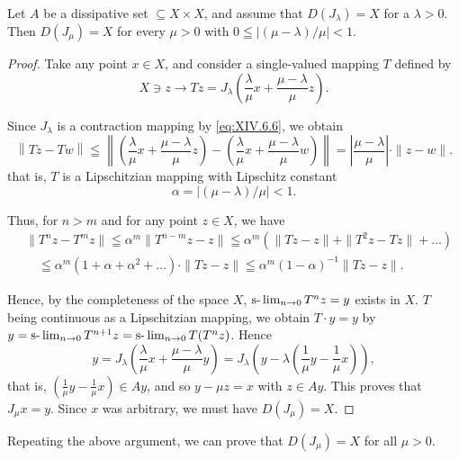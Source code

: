 \begin{lemma}\label{lem:XIV.6.Lemma.2} Let $A$ be a dissipative set $\subseteq X \times X$, and assume that $D(J_{\lambda}) = X$ for a $\lambda > 0$. Then $D(J_{\mu}) = X$ for every $\mu > 0$ with $0 \leqq |(\mu - \lambda)/\mu| < 1$. 
\end{lemma}

\begin{proof}
 Take any point $x \in X$, and consider a single-valued mapping $T$ defined by 
\[
X \ni z \rightarrow T z = J _{\lambda} \left(\frac {\lambda}{\mu} x + \frac {\mu - \lambda}{\mu} z\right). \]

Since $J_{\lambda}$ is a contraction mapping by \eqref{eq:XIV.6.6}, we obtain 
\[
\left\| T z - T w \right\| \leqq \left\| \left(\frac {\lambda}{\mu} x + \frac {\mu - \lambda}{\mu} z\right) - \left(\frac {\lambda}{\mu} x + \frac {\mu - \lambda}{\mu} w\right) \right\| = \left| \frac {\mu - \lambda}{\mu} \right| \cdot \| z - w \|.
\]
that is, $T$ is a Lipschitzian mapping with Lipschitz constant 
\[
\alpha = | (\mu - \lambda) / \mu | < 1.
\]

Thus, for $n > m$ and for any point $z \in X$, we have 
\[
\begin{aligned} & {\| T ^{n} z - T ^{m} z \| \leqq \alpha^{m} \| T ^{n-m} z - z \| \leqq \alpha^{m} (\| T z - z \| + \| T ^{2} z - T z \| + \dots)} \\ & {\quad \leqq \alpha^{m} (1 + \alpha + \alpha^{2} + \dots) \cdot \| T z - z \| \leqq \alpha^{m} (1 - \alpha) ^{-1} \| T z - z \|.} \end{aligned}
\]

Hence, by the completeness of the space $X$, $\text{s-}\lim\nolimits_{n\to 0}T^n z = y$ exists in $X$. $T$ being continuous as a Lipschitzian mapping, we obtain $T\cdot y = y$ by $y = \text{s-}\lim\nolimits_{n\to 0}T^{n+1}z = \text{s-}\lim\nolimits_{n\to 0}T(T^n z)$. Hence 
\[ y = J _{\lambda} \left(\frac {\lambda}{\mu} x + \frac {\mu - \lambda}{\mu} y\right) = J _{\lambda} \left(y - \lambda \left(\frac {1}{\mu} y - \frac {1}{\mu} x\right)\right),
\]
that is, $\left(\frac {1}{\mu} y - \frac {1}{\mu} x\right) \in A y$, and so $y - \mu z = x$ with $z \in Ay$. This proves that $J_{\mu}x = y$. Since $x$ was arbitrary, we must have $D(J_{\mu}) = X$. 
\end{proof}

\begin{corollaryu} Repeating the above argument, we can prove that $D(J_{\mu}) = X$ for all $\mu > 0$. 
\end{corollaryu}


